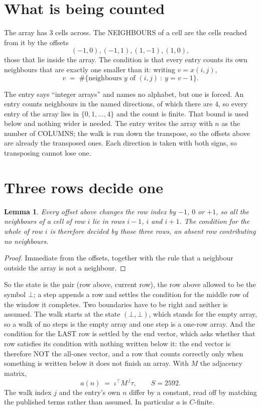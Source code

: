 \documentclass[11pt,a4paper]{article}
\theoremstyle{plain}
\newtheorem{lemma}[theorem]{Lemma}
\theoremstyle{definition}
\begin{document}
\section{What is being counted}

The array has $3$ cells across. The NEIGHBOURS of a cell are the cells reached from it by the
offsets
\[
(-1,0), (-1,1), (1,-1), (1,0),
\]
those that lie inside the array. The condition is that every entry counts its own neighbours
that are exactly one smaller than it: writing $v=x(i,j)$,
\[
v\;=\;\#\{\text{neighbours } y \text{ of } (i,j)\ :\ y=v-1\} .
\]

The entry says ``integer arrays'' and names no alphabet, but one is forced. An entry counts
neighbours in the named directions, of which there are $4$, so every entry of the array
lies in $\{0,1,\dots,4\}$ and the count is finite. That bound is used below and
nothing wider is needed. The entry writes the array with $n$ as the number of COLUMNS; the walk is run down the transpose, so the offsets above are already the transposed ones. Each direction is taken with both signs, so transposing cannot lose one.

\section{Three rows decide one}

\begin{lemma}\label{lem:win}
Every offset above changes the row index by $-1$, $0$ or $+1$, so all the neighbours of a cell
of row $i$ lie in rows $i-1$, $i$ and $i+1$. The condition for the whole of row $i$ is
therefore decided by those three rows, an absent row contributing no neighbours.
\end{lemma}

\begin{proof}
Immediate from the offsets, together with the rule that a neighbour outside the array is not a
neighbour.
\end{proof}

So the state is the pair (row above, current row), the row above allowed to be the symbol
$\bot$; a step appends a row and settles the condition for the middle row of the window it
completes. Two boundaries have to be right and neither is assumed. The walk starts at the state
$(\bot,\bot)$, which stands for the empty array, so a walk of no steps is the empty array and
one step is a one-row array. And the condition for the LAST row is settled by the end vector,
which asks whether that row satisfies its condition with nothing written below it: the end
vector is therefore NOT the all-ones vector, and a row that counts correctly only when
something is written below it does not finish an array. With $M$ the adjacency matrix,
\[
a(n)\;=\;\iota^{\!\top}M^{\,j}\tau ,\qquad S=2592.
\]
The walk index $j$ and the entry's own $n$ differ by a constant, read off by matching the
published terms rather than assumed. In particular $a$ is $C$-finite.
\end{document}
